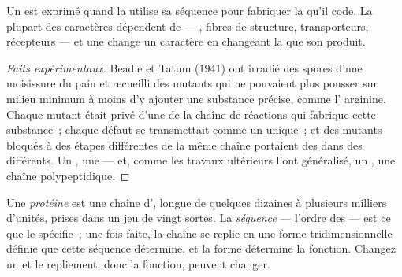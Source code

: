 \begin{proposition}\label{prop:g11:gene-expression:onegene}
Un  est exprimé quand la  utilise sa séquence pour
fabriquer la  qu'il code. La plupart des caractères dépendent
de  --- , fibres de structure, transporteurs,
récepteurs --- et une  change un caractère en changeant la
 que son  produit.
\end{proposition}
\begin{proof}[Faits expérimentaux]
Beadle et Tatum (1941) ont irradié des spores d'une moisissure du pain
et recueilli des mutants qui ne pouvaient plus pousser sur milieu
minimum à moins d'y ajouter une substance précise, comme l'
arginine. Chaque mutant était privé d'une  de la chaîne de
réactions qui fabrique cette substance~; chaque défaut se transmettait
comme un  unique~; et des mutants bloqués à des étapes différentes
de la même chaîne portaient des  dans des  différents. Un
, une  --- et, comme les travaux ultérieurs l'ont généralisé,
un , une chaîne polypeptidique.
\end{proof}

\begin{definition}\label{def:g11:gene-expression:protein}
Une \emph{protéine} est une chaîne d',
longue de quelques dizaines à plusieurs milliers d'unités, prises dans
un jeu de vingt sortes. La \emph{séquence} --- l'ordre des  --- est ce que le  spécifie~; une fois faite, la chaîne se
replie en une forme tridimensionnelle définie que cette séquence
détermine, et la forme détermine la fonction. Changez un  et
le repliement, donc la fonction, peuvent changer.
\end{definition}

